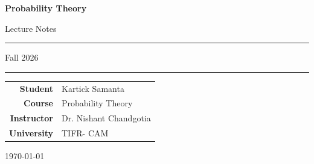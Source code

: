 \documentclass[
11pt,
a4paper,
oneside
]{article}
\begin{document}

\begin{titlepage}

\thispagestyle{empty}

\begin{center}

\vspace*{2cm}

{\Huge\bfseries Probability Theory}

\vspace{0.4cm}

{\Large Lecture Notes}

\vspace{0.8cm}

\rule{0.8\linewidth}{1pt}

\vspace{0.3cm}

{\Large Fall 2026}

\vspace{0.3cm}

\rule{0.8\linewidth}{0.5pt}

\vfill

\begin{tabular}{rl}

\textbf{Student} &
Kartick Samanta \\[0.4cm]

\textbf{Course} &
Probability Theory \\[0.4cm]

\textbf{Instructor} &
Dr. Nishant Chandgotia \\[0.4cm]

\textbf{University} &
TIFR- CAM \\

\end{tabular}

\vfill


\vspace{0.7cm}

{\large\today}

\end{center}

\end{titlepage}

\end{document}
